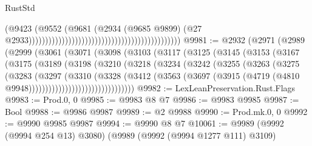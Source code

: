 \begin{lexlean}{RustStd}
\begin{coremodule}
                                                                                      (@9423
                                                                                        (@9552
                                                                                          (@9681
                                                                                            (@2934
                                                                                              (@9685
                                                                                                @9899)
                                                                                              (@27
                                                                                                @2933))))))))))))))))))))))))))))))))))))))))))))))
@9981 := @2932
    (@2971
      (@2989
        (@2999
          (@3061
            (@3071
              (@3098
                (@3103
                  (@3117
                    (@3125
                      (@3145
                        (@3153
                          (@3167
                            (@3175
                              (@3189
                                (@3198
                                  (@3210
                                    (@3218
                                      (@3234
                                        (@3242
                                          (@3255
                                            (@3263
                                              (@3275
                                                (@3283
                                                  (@3297
                                                    (@3310
                                                      (@3328
                                                        (@3412
                                                          (@3563
                                                            (@3697
                                                              (@3915
                                                                (@4719
                                                                  (@4810
                                                                    @9948))))))))))))))))))))))))))))))))
@9982 := LexLeanPreservation.Rust.Flags
@9983 := Prod.{0, 0}
@9985 := @9983 @8 @7
@9986 := @9983 @9985
@9987 := Bool
@9988 := @9986 @9987
@9989 := @2 @9988
@9990 := Prod.mk.{0, 0}
@9992 := @9990 @9985 @9987
@9994 := @9990 @8 @7
@10061 := @9989
    (@9992 (@9994 @254 @13) @3080)
    (@9989
      (@9992 (@9994 @1277 @111) @3109)

\end{coremodule}
\end{lexlean}
